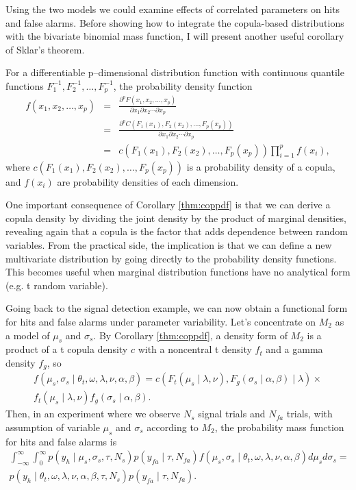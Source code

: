 \documentclass[12pt]{report}
\begin{document}
Using the two models we could examine effects of correlated parameters on hits and false alarms. Before showing how to integrate the copula-based distributions with the bivariate binomial mass function, I will present another useful corollary of Sklar's theorem. 
%
\begin{cors}
\label{thm:coppdf}
For a differentiable p--dimensional distribution function with
continuous quantile functions $F_1^{-1},
F_2^{-1}, \dots, F_p^{-1}$, the probability density function
%
\begin{eqnarray}
f(x_1,x_2, \dots, x_p) & = &
\frac{\partial^p F(x_1, x_2, \dots, x_p)}{\partial x_1 \partial x_2 \cdots \partial x_p} \nonumber \\ 
 & = & \frac{\partial^p C(F_1(x_1), F_2(x_2), \dots, F_p(x_p))}{\partial x_1 \partial x_2 \cdots \partial x_p} \nonumber \\
 & = & c(F_1(x_1), F_2(x_2), \dots, F_p(x_p))\prod_{i = 1}^p f(x_i),
\end{eqnarray}
where $c(F_1(x_1), F_2(x_2), \dots, F_p(x_p))$ is a probability density of a copula, and $f(x_i)$ are probability densities of each dimension.
\end{cors}
%
One important consequence of Corollary \ref{thm:coppdf} is that we can derive a copula density by dividing the joint density by the product of marginal densities, revealing again that a copula is the factor that adds dependence between random variables. From the practical side, the implication is that we can define a new multivariate distribution by going directly to the probability density functions. This becomes useful when marginal distribution functions have no analytical form (e.g. t random variable). 

Going back to the signal detection example, we can now obtain a functional form for hits and false alarms under parameter variability. Let's concentrate on $M_2$ as a model of $\mu_s$ and $\sigma_s$. By Corollary \ref{thm:coppdf}, a density form of $M_2$ is a product of a t copula density $c$ with a noncentral t density $f_t$ and a gamma density $f_g$, so
\begin{eqnarray}
f(\mu_s,\sigma_s \mid \theta_t, \omega, \lambda, \nu, \alpha, \beta) = c(F_t(\mu_s \mid \lambda, \nu), F_g(\sigma_s \mid \alpha, \beta) \mid \lambda) \times \nonumber \\
f_t(\mu_s \mid \lambda, \nu)f_g(\sigma_s \mid \alpha, \beta).
\end{eqnarray}
Then, in an experiment where we observe $N_s$ signal trials and $N_{fa}$ trials, with assumption of variable $\mu_s$ and $\sigma_s$ according to $M_2$,
the probability mass function for hits and false alarms is
\begin{eqnarray}
\int_{-\infty}^{\infty}\int_0^{\infty}p(y_h \mid \mu_s, \sigma_s, \tau, N_s)p(y_{fa} \mid \tau, N_{fa})f(\mu_s,\sigma_s \mid \theta_t, \omega, \lambda, \nu, \alpha, \beta)d\mu_sd\sigma_s = \nonumber \\
p(y_h \mid \theta_t, \omega, \lambda, \nu, \alpha, \beta, \tau, N_s)p(y_{fa} \mid \tau, N_{fa}).
\end{eqnarray}
\end{document}
